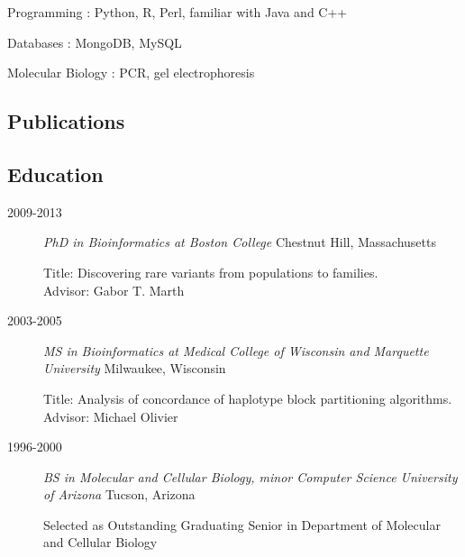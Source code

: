 \documentclass[]{article}
\begin{document}
Programming : Python, R, Perl, familiar with Java and C++

Databases : MongoDB, MySQL

Molecular Biology : PCR, gel electrophoresis

\subsection{Publications}\label{selected-publications}

\renewcommand\refname{}
 
 
\nocite{*}



\subsection{Education}\label{education}

\begin{description}
\item[2009-2013]
\emph{PhD in Bioinformatics at Boston College} Chestnut Hill, Massachusetts

Title: Discovering rare variants from populations to families. \\
Advisor: Gabor T. Marth
\item[2003-2005]
\emph{MS in Bioinformatics at Medical College of Wisconsin and Marquette
University} Milwaukee, Wisconsin

Title: Analysis of concordance of haplotype block partitioning
algorithms. Advisor: Michael Olivier
\item[1996-2000]
\emph{BS in Molecular and Cellular Biology, minor Computer Science
University of Arizona} Tucson, Arizona

Selected as Outstanding Graduating Senior in Department of Molecular and
Cellular Biology
\end{description}

%
%
\end{document}
